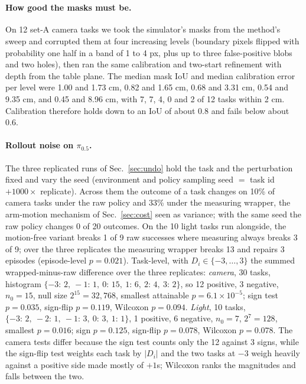 \documentclass{article}
\newcommand{\pihalf}{$\pi_{0.5}$}
\newcommand{\ph}{\textsuperscript{\dag}}
\begin{document}
\paragraph{How good the masks must be\ph.} On 12
set-A camera tasks we took the simulator's masks from the method's sweep and corrupted them at four increasing levels
(boundary pixels flipped with probability one half in a band of 1 to 4 px, plus up to three false-positive blobs and two
holes), then ran the same calibration and two-start refinement with depth from the table plane. The median mask IoU and
median calibration error per level were 1.00 and 1.73 cm, 0.82 and 1.65 cm, 0.68 and 3.31 cm, 0.54 and 9.35 cm, and 0.45
and 8.96 cm, with 7, 7, 4, 0 and 2 of 12 tasks within 2 cm. Calibration therefore holds down to an IoU of about 0.8 and
fails below about 0.6.

\paragraph{Rollout noise on \pihalf.} The three replicated runs of Sec.~\ref{sec:undo} hold the task and the
perturbation fixed and vary the seed (environment and policy sampling seed $=$ task id $+ 1000 \times$ replicate).
Across them the outcome of a task changes on 10\% of camera tasks under the raw policy and 33\% under the measuring
wrapper, the arm-motion mechanism of Sec.~\ref{sec:cost} seen as variance; with the same seed the raw policy changes 0
of 20 outcomes. On the 10 light tasks run alongside, the motion-free variant breaks 1 of 9 raw successes where
measuring always breaks 3 of 9; over the three replicates the measuring wrapper breaks 13 and repairs 3 episodes
(episode-level $p=0.021$). Task-level, with $D_i \in \{-3, \dots, 3\}$ the
summed wrapped-minus-raw difference over the three replicates: \emph{camera}, 30 tasks, histogram $\{-3{:}\,2,\ -1{:}\,1,\
0{:}\,15,\ 1{:}\,6,\ 2{:}\,4,\ 3{:}\,2\}$, so 12 positive, 3 negative, $n_0 = 15$, null size $2^{15} = 32{,}768$,
smallest attainable $p = 6.1\times10^{-5}$; sign test $p = 0.035$, sign-flip $p = 0.119$, Wilcoxon $p = 0.094$.
\emph{Light}, 10 tasks, $\{-3{:}\,2,\ -2{:}\,1,\ -1{:}\,3,\ 0{:}\,3,\ 1{:}\,1\}$, 1 positive, 6 negative, $n_0 = 7$,
$2^7 = 128$, smallest $p = 0.016$; sign $p = 0.125$, sign-flip $p = 0.078$, Wilcoxon $p = 0.078$. The camera tests
differ because the sign test counts only the 12 against 3 signs, while the sign-flip test weights each task by $|D_i|$
and the two tasks at $-3$ weigh heavily against a positive side made mostly of $+1$s; Wilcoxon ranks the magnitudes and
falls between the two.
\end{document}
